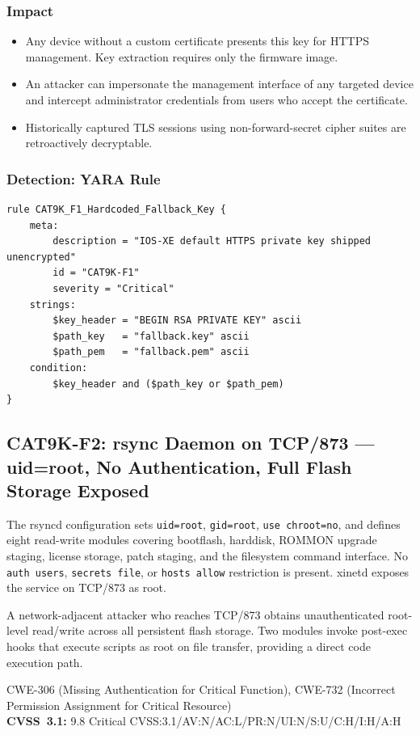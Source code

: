 \documentclass[11pt,a4paper]{article}
\begin{document}
\subsubsection{Impact}

\begin{itemize}[nosep]
  \item Any device without a custom certificate presents this key for HTTPS
    management. Key extraction requires only the firmware image.
  \item An attacker can impersonate the management interface of any targeted device
    and intercept administrator credentials from users who accept the certificate.
  \item Historically captured TLS sessions using non-forward-secret cipher suites
    are retroactively decryptable.
\end{itemize}

\subsubsection{Detection: YARA Rule}

\begin{lstlisting}[style=yara]
rule CAT9K_F1_Hardcoded_Fallback_Key {
    meta:
        description = "IOS-XE default HTTPS private key shipped unencrypted"
        id = "CAT9K-F1"
        severity = "Critical"
    strings:
        $key_header = "BEGIN RSA PRIVATE KEY" ascii
        $path_key   = "fallback.key" ascii
        $path_pem   = "fallback.pem" ascii
    condition:
        $key_header and ($path_key or $path_pem)
}
\end{lstlisting}

\subsection{CAT9K-F2: rsync Daemon on TCP/873 --- uid=root, No Authentication, Full Flash Storage Exposed}

\begin{overviewbox}
The rsyncd configuration sets \texttt{uid=root}, \texttt{gid=root},
\texttt{use chroot=no}, and defines eight read-write modules covering bootflash,
harddisk, ROMMON upgrade staging, license storage, patch staging, and the filesystem
command interface. No \texttt{auth users}, \texttt{secrets file}, or
\texttt{hosts allow} restriction is present. xinetd exposes the service on TCP/873
as root.

A network-adjacent attacker who reaches TCP/873 obtains unauthenticated root-level
read/write across all persistent flash storage. Two modules invoke post-exec hooks
that execute scripts as root on file transfer, providing a direct code execution path.

CWE-306 (Missing Authentication for Critical Function), CWE-732 (Incorrect Permission Assignment for Critical Resource)\\
\textbf{CVSS~3.1:} 9.8 Critical \quad CVSS:3.1/AV:N/AC:L/PR:N/UI:N/S:U/C:H/I:H/A:H
\end{overviewbox}
\end{document}
